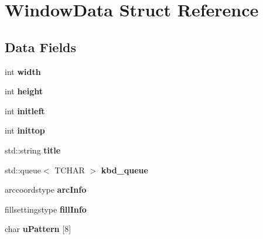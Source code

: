 \hypertarget{struct_window_data}{}\section{Window\+Data Struct Reference}
\label{struct_window_data}
\subsection*{Data Fields}
\begin{DoxyCompactItemize}
\item 
int {\bfseries width}\hypertarget{struct_window_data_a2474a5474cbff19523a51eb1de01cda4}{}\label{struct_window_data_a2474a5474cbff19523a51eb1de01cda4}

\item 
int {\bfseries height}\hypertarget{struct_window_data_ad12fc34ce789bce6c8a05d8a17138534}{}\label{struct_window_data_ad12fc34ce789bce6c8a05d8a17138534}

\item 
int {\bfseries initleft}\hypertarget{struct_window_data_a629ec85955d1af823626456af41df399}{}\label{struct_window_data_a629ec85955d1af823626456af41df399}

\item 
int {\bfseries inittop}\hypertarget{struct_window_data_a4f5c150af34da23ffa6682254a182ba3}{}\label{struct_window_data_a4f5c150af34da23ffa6682254a182ba3}

\item 
std\+::string {\bfseries title}\hypertarget{struct_window_data_ac30fed21fe991cc8475ce543929f8b72}{}\label{struct_window_data_ac30fed21fe991cc8475ce543929f8b72}

\item 
std\+::queue$<$ T\+C\+H\+AR $>$ {\bfseries kbd\+\_\+queue}\hypertarget{struct_window_data_a9bef7c7151125ab4e76c880678a15e29}{}\label{struct_window_data_a9bef7c7151125ab4e76c880678a15e29}

\item 
arccoordstype {\bfseries arc\+Info}\hypertarget{struct_window_data_a7877d2832328756700740c195d70c441}{}\label{struct_window_data_a7877d2832328756700740c195d70c441}

\item 
fillsettingstype {\bfseries fill\+Info}\hypertarget{struct_window_data_ac43cb0d545649368bda72882e6953645}{}\label{struct_window_data_ac43cb0d545649368bda72882e6953645}

\item 
char {\bfseries u\+Pattern} \mbox{[}8\mbox{]}\hypertarget{struct_window_data_a79921d8d7f54a156b41ce6ea6ba20ce1}{}\label{struct_window_data_a79921d8d7f54a156b41ce6ea6ba20ce1}


\end{DoxyCompactItemize}
